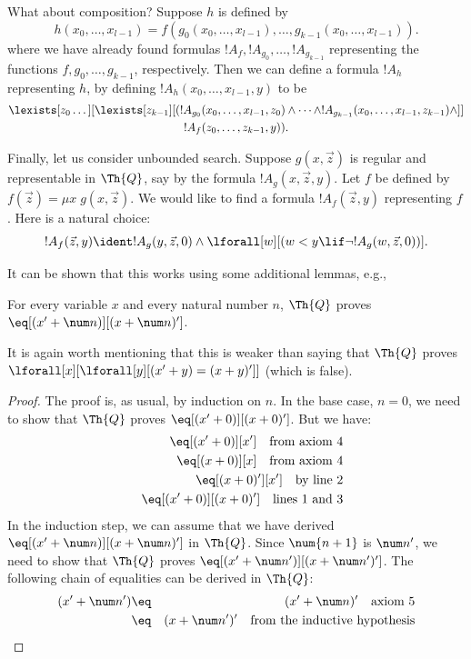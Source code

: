 \documentclass[../../../include/open-logic-section]{subfiles}
\begin{document}
What about composition? Suppose $h$ is defined by
\[
h(x_0,\dots,x_{l-1}) = f(g_0(x_0,\dots,x_{l-1}), \dots,
g_{k-1}(x_0,\dots,x_{l-1})).
\]
where we have already found formulas $!A_f, !A_{g_0}, \dots,
!A_{g_{k-1}}$ representing the functions $f,g_0,\dots,g_{k-1}$,
respectively. Then we can define a formula $!A_h$ representing $h$,
by defining $!A_h(x_0,\dots,x_{l-1},y)$ to be
\begin{multline*}
  \lexists[z_0\dots][\lexists[z_{k-1}][(!A_{g_0}(x_0,\dots,x_{l-1},z_0) \land
  \dots \land !A_{g_{k-1}}(x_0,\dots,x_{l-1},z_{k-1}) \land]]\\
  !A_f(z_0,\dots,z_{k-1},y)).
\end{multline*}

Finally, let us consider unbounded search. Suppose $g(x,\vec z)$ is
regular and representable in $\Th{Q}$, say by the formula $!A_g(x,\vec
z,y)$. Let $f$ be defined by $f(\vec z) = \mu x \; g(x,\vec z)$. We would
like to find a formula $!A_f(\vec z,y)$ representing $f$. Here is
a natural choice:
\[
!A_f(\vec z,y) \ident !A_g(y,\vec z,0) \land \lforall[w][(w < y
\lif \lnot !A_g(w,\vec z,0))].
\]

It can be shown that this works using some additional lemmas, e.g.,

\begin{lem}
  For every variable $x$ and every natural number $n$, $\Th{Q}$ proves $\eq[(x'
  + \num n)][(x + \num n)']$.
\end{lem}

It is again worth mentioning that this is weaker than saying that $\Th{Q}$
proves $\lforall[x][\lforall[y][(x' + y) = (x +y)']]$ (which is false).

\begin{proof}
The proof is, as usual, by induction on $n$. In the base case, $n =
0$, we need to show that $\Th{Q}$ proves $\eq[(x'+0)][(x+0)']$. But we have:
\begin{eqnarray*}
& & \eq[(x' + 0)][x'] \quad \text{from axiom 4} \\
& & \eq[(x + 0)][x] \quad \text{from axiom 4} \\
& & \eq[(x+0)'][x'] \quad \text{by line 2} \\
& & \eq[(x' + 0)][(x + 0)'] \quad \text{lines 1 and 3}
\end{eqnarray*}
In the induction step, we can assume that we have derived $\eq[(x' +
  \num n)][(x + \num n)']$ in $\Th{Q}$. Since $\num{n+1}$ is $\num
n'$, we need to show that $\Th{Q}$ proves $\eq[(x' + \num n')][(x + \num
n')']$. The following chain of equalities can be derived in $\Th{Q}$:
\begin{eqnarray*}
(x' + \num n') & \eq & (x' + \num n)' \quad \text{axiom 5} \\
& \eq & (x + \num n')' \quad \text{from the inductive hypothesis}
\end{eqnarray*}
\end{proof}
\end{document}
